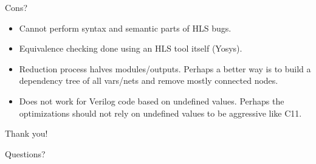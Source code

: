 \documentclass[notes, xcolor=dvipsnames]{beamer}
\begin{document}
    \begin{frame}{Cons?}
        
        \begin{itemize}
            \item Cannot perform syntax and semantic parts of HLS bugs. 
            \item Equivalence checking done using an HLS tool itself (Yosys). 
            \item Reduction process halves modules/outputs. Perhaps a better way is to build a dependency tree of all vars/nets and remove mostly connected nodes.  
            \item Does not work for Verilog code based on undefined values. Perhaps the optimizations should not rely on undefined values to be aggressive like C11. 
        \end{itemize}

    \end{frame}

    \begin{frame}{Thank you!}

        Questions?
        
    \end{frame}
\end{document}
